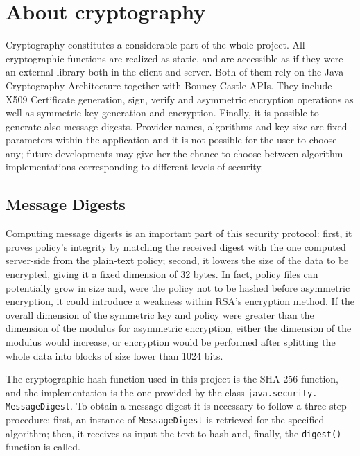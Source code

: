 \section{About cryptography}
Cryptography constitutes a considerable part of the whole project. All cryptographic functions are realized as static, and are accessible as if they were an external library both in the client and server. Both of them rely on the Java Cryptography Architecture together with Bouncy Castle APIs. They include X509 Certificate generation, sign, verify and asymmetric encryption operations as well as symmetric key generation and encryption. Finally, it is possible to generate also message digests. Provider names, algorithms and key size are fixed parameters within the application and it is not possible for the user to choose any; future developments may give her the chance to choose between algorithm implementations corresponding to different levels of security.

\subsection{Message Digests}
Computing message digests is an important part of this security protocol: first, it proves policy's integrity by matching the received digest with the one computed server-side from the plain-text policy; second, it lowers the size of the data to be encrypted, giving it a fixed dimension of 32 bytes. In fact, policy files can potentially grow in size and, were the policy not to be hashed before asymmetric encryption, it could introduce a weakness within RSA's encryption method. If the overall dimension of the symmetric key and policy were greater than the dimension of the modulus for asymmetric encryption, either the dimension of the modulus would increase, or encryption would be performed after splitting the whole data into blocks of size lower than 1024 bits.

The cryptographic hash function used in this project is the SHA-256 function, and the implementation is the one provided by the class \texttt{java.security. MessageDigest}. To obtain a message digest it is necessary to follow a three-step procedure: first, an instance of \texttt{MessageDigest} is retrieved for the specified algorithm; then, it receives as input the text to hash and, finally, the \texttt{digest()} function is called.



